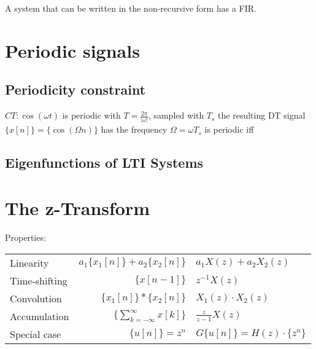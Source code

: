 \documentclass[8pt,a4paper]{scrartcl}
\begin{document}
\begin{multicols*}{3}

A system that can be written in the non-recursive form has a FIR.


\section{Periodic signals}


\subsection{Periodicity constraint}

$CT: \cos(\omega t)$ is periodic with $T=\frac{2\pi}{|\omega|}$, sampled with $T_s$ the resulting DT signal $\{x[n]\}=\{\cos(\Omega n)\}$ has the frequency $\Omega=\omega T_s$ is periodic iff



\subsection{Eigenfunctions of LTI Systems}



\section{The z-Transform}


Properties:

\begin{tabular}{@{$\bullet$ }lr@{ $\leftrightarrow$ }l}
Linearity&$a_1\{x_1[n]\}+a_2\{x_2[n]\}$&$a_1X(z)+a_2X_2(z)$\\
Time-shifting&$\{x[n-1]\}$&$z^{-1}X(z)$\\
Convolution&$\{x_1[n]\}\ast\{x_2[n]\}$&$X_1(z)\cdot X_2(z)$\\
Accumulation&$\{\sum\limits_{k=-\infty}^\infty x[k]\}$&$\frac{z}{z-1}X(z)$\\
Special case&$\{u[n]\}=z^n$&$G\{u[n]\}=H(z)\cdot\{z^n\}$
\end{tabular}


\end{multicols*}
\end{document}
